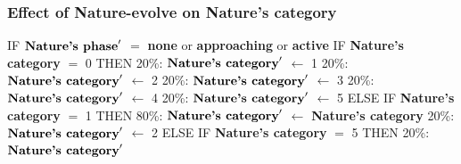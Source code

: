 \documentclass{article}%
\begin{document}
\subsubsection{Effect of Nature{-}evolve on Nature's category}%
\label{ssubsec:Effect of Nature{-}evolve on Nature's category}%
\begin{flushleft}%
IF %
$\mbox{\textbf{Nature's phase}} '$%
$=$%
\textbf{none}%
 or %
\textbf{approaching}%
 or %
\textbf{active}%
\linebreak%
\hspace*{2em}%
IF %
\textbf{Nature's category}%
$=$%
0%
\linebreak%
\hspace*{4em}%
THEN %
\linebreak%
\hspace*{6em}%
20\%: %
$\mbox{\textbf{Nature's category}} '$%
$\leftarrow$%
1%
\linebreak%
\hspace*{6em}%
20\%: %
$\mbox{\textbf{Nature's category}} '$%
$\leftarrow$%
2%
\linebreak%
\hspace*{6em}%
20\%: %
$\mbox{\textbf{Nature's category}} '$%
$\leftarrow$%
3%
\linebreak%
\hspace*{6em}%
20\%: %
$\mbox{\textbf{Nature's category}} '$%
$\leftarrow$%
4%
\linebreak%
\hspace*{6em}%
20\%: %
$\mbox{\textbf{Nature's category}} '$%
$\leftarrow$%
5%
\linebreak%
\hspace*{4em}%
ELSE %
IF %
\textbf{Nature's category}%
$=$%
1%
\linebreak%
\hspace*{6em}%
THEN %
\linebreak%
\hspace*{8em}%
80\%: %
$\mbox{\textbf{Nature's category}} '$%
$\leftarrow$%
\textbf{Nature's category}%
\linebreak%
\hspace*{8em}%
20\%: %
$\mbox{\textbf{Nature's category}} '$%
$\leftarrow$%
2%
\linebreak%
\hspace*{6em}%
ELSE %
IF %
\textbf{Nature's category}%
$=$%
5%
\linebreak%
\hspace*{8em}%
THEN %
\linebreak%
\hspace*{10em}%
20\%: %
$\mbox{\textbf{Nature's category}} '$%

\end{flushleft}
\end{document}

